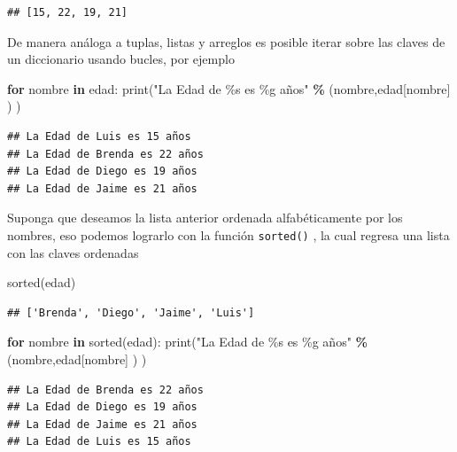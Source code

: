\documentclass[
]{book}
\newenvironment{Shaded}{\begin{snugshade}}{\end{snugshade}}
\newcommand{\BuiltInTok}[1]{#1}
\newcommand{\ControlFlowTok}[1]{\textcolor[rgb]{0.13,0.29,0.53}{\textbf{#1}}}
\newcommand{\KeywordTok}[1]{\textcolor[rgb]{0.13,0.29,0.53}{\textbf{#1}}}
\newcommand{\NormalTok}[1]{#1}
\newcommand{\OperatorTok}[1]{\textcolor[rgb]{0.81,0.36,0.00}{\textbf{#1}}}
\newcommand{\SpecialCharTok}[1]{\textcolor[rgb]{0.00,0.00,0.00}{#1}}
\newcommand{\StringTok}[1]{\textcolor[rgb]{0.31,0.60,0.02}{#1}}
\theoremstyle{definition}
\theoremstyle{definition}
\theoremstyle{definition}
\theoremstyle{definition}
\theoremstyle{remark}
\begin{document}
\begin{verbatim}
## [15, 22, 19, 21]
\end{verbatim}

De manera análoga a tuplas, listas y arreglos es posible iterar sobre las claves de un diccionario usando bucles, por ejemplo

\begin{Shaded}
\begin{Highlighting}[]
\ControlFlowTok{for}\NormalTok{ nombre }\KeywordTok{in}\NormalTok{ edad:}
  \BuiltInTok{print}\NormalTok{(}\StringTok{"La Edad de }\SpecialCharTok{\%s}\StringTok{ es }\SpecialCharTok{\%g}\StringTok{ años"} \OperatorTok{\%}\NormalTok{ (nombre,edad[nombre] ) )}
\end{Highlighting}
\end{Shaded}

\begin{verbatim}
## La Edad de Luis es 15 años
## La Edad de Brenda es 22 años
## La Edad de Diego es 19 años
## La Edad de Jaime es 21 años
\end{verbatim}

Suponga que deseamos la lista anterior ordenada alfabéticamente por los nombres, eso podemos lograrlo con la función \texttt{sorted()} , la cual regresa una lista con las claves ordenadas

\begin{Shaded}
\begin{Highlighting}[]
\BuiltInTok{sorted}\NormalTok{(edad)}
\end{Highlighting}
\end{Shaded}

\begin{verbatim}
## ['Brenda', 'Diego', 'Jaime', 'Luis']
\end{verbatim}

\begin{Shaded}
\begin{Highlighting}[]
\ControlFlowTok{for}\NormalTok{ nombre }\KeywordTok{in} \BuiltInTok{sorted}\NormalTok{(edad):}
  \BuiltInTok{print}\NormalTok{(}\StringTok{"La Edad de }\SpecialCharTok{\%s}\StringTok{ es }\SpecialCharTok{\%g}\StringTok{ años"} \OperatorTok{\%}\NormalTok{ (nombre,edad[nombre] ) )}
\end{Highlighting}
\end{Shaded}

\begin{verbatim}
## La Edad de Brenda es 22 años
## La Edad de Diego es 19 años
## La Edad de Jaime es 21 años
## La Edad de Luis es 15 años
\end{verbatim}
\end{document}
